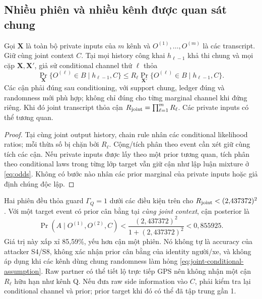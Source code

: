 \subsection{Nhiều phiên và nhiều kênh được quan sát chung}
\begin{corollary}\label{cor:joint-channels}
Gọi $\mathbf X$ là toàn bộ private inputs của $m$ kênh và $O^{(1)},\ldots,O^{(m)}$ là các transcript.
Giữ cùng joint context $C$. Tại mọi history công khai $h_{\ell-1}$ khả thi chung và mọi cặp
$\mathbf X,\mathbf X'$, giả sử conditional channel thứ $\ell$ thỏa
\begin{equation}
\Pr_{\mathbf X}\{O^{(\ell)}\in B\mid h_{\ell-1},C\}
\le R_\ell\Pr_{\mathbf X'}\{O^{(\ell)}\in B\mid h_{\ell-1},C\}.
\label{eq:joint-conditional-assumption}
\end{equation}
Các cận phải đúng sau conditioning, với support chung, ledger đúng và randomness mới phù hợp;
không chỉ đúng cho từng marginal channel khi đứng riêng. Khi đó joint transcript thỏa cận
$R_{\rm joint}=\prod_{\ell=1}^mR_\ell$. Các private inputs có thể tương quan.
\end{corollary}
\begin{proof}
Tại cùng joint output history, chain rule nhân các conditional likelihood ratios; mỗi thừa số
bị chặn bởi $R_\ell$. Cộng/tích phân theo event cần xét giữ cùng tích các cận. Nếu private inputs
được lấy theo một prior tương quan, tích phân theo conditional laws trong từng lớp target vẫn
giữ cận như lập luận mixture ở \eqref{eq:odds}. Không có bước nào nhân các prior marginal của
private inputs hoặc giả định chúng độc lập.
\end{proof}

Hai phiên đều thỏa guard $\Gamma_Q=1$ dưới các điều kiện trên cho
$R_{\rm joint}<(2{,}437372)^2$. Với một target event có prior cân bằng tại \emph{cùng joint context},
cận posterior là
\begin{equation}
\Pr(A\mid O^{(1)},O^{(2)},C)
<\frac{(2{,}437372)^2}{1+(2{,}437372)^2}<0{,}855925.
\label{eq:two-session-posterior}
\end{equation}
Giá trị này xấp xỉ 85,59\%, yếu hơn cận một phiên. Nó không tự là accuracy của attacker S4/S8,
không xác nhận prior cân bằng của identity người/xe, và không áp dụng khi các kênh dùng chung
randomness làm hỏng \eqref{eq:joint-conditional-assumption}. Raw partner có thể tiết lộ trực tiếp
GPS nên không nhận một cận $R_\ell$ hữu hạn như kênh Q. Nếu đưa raw side information vào $C$,
phải kiểm tra lại conditional channel và prior; prior target khi đó có thể đã tập trung gần 1.

